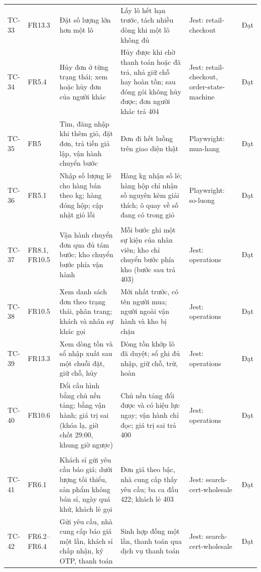 \begin{longtable}{L{1.40cm} L{1.55cm} L{4.00cm} L{4.05cm} L{1.95cm} L{1.95cm}}
TC-33 & FR13.3 & Đặt số lượng lớn hơn một lô & Lấy lô hết hạn trước, tách nhiều dòng khi một lô không đủ & Jest: retail-checkout & Đạt \\
TC-34 & FR5.4 & Hủy đơn ở từng trạng thái; xem hoặc hủy đơn của người khác & Hủy được khi chờ thanh toán hoặc đã trả, nhả giữ chỗ hay hoàn tồn; sau đóng gói không hủy được; đơn người khác trả 404 & Jest: retail-checkout, order-state-machine & Đạt \\
TC-35 & FR5 & Tìm, đăng nhập khi thêm giỏ, đặt đơn, trả tiền giả lập, vận hành chuyển bước & Đơn đi hết luồng trên giao diện thật & Playwright: mua-hang & Đạt \\
TC-36 & FR5.1 & Nhập số lượng lẻ cho hàng bán theo kg; hàng đóng hộp; cập nhật giỏ lỗi & Hàng kg nhận số lẻ; hàng hộp chỉ nhận số nguyên kèm giải thích; ô quay về số đang có trong giỏ & Playwright: so-luong & Đạt \\
 \\
TC-37 & FR8.1, FR10.5 & Vận hành chuyển đơn qua đủ tám bước; kho chuyển bước phía vận hành & Mỗi bước ghi một sự kiện của nhân viên; kho chỉ chuyển bước phía kho (bước sau trả 403) & Jest: operations & Đạt \\
TC-38 & FR10.5 & Xem danh sách đơn theo trạng thái, phân trang; khách và nhân sự khác gọi & Mới nhất trước, có tên người mua; người ngoài vận hành và kho bị chặn & Jest: operations & Đạt \\
TC-39 & FR13.3 & Xem dòng tồn và sổ nhập xuất sau một chuỗi đặt, giữ chỗ, hủy & Dòng tồn khớp lô đã duyệt; sổ ghi đủ nhập, giữ chỗ, trừ, hoàn & Jest: operations & Đạt \\
TC-40 & FR10.6 & Đổi cấu hình bằng chủ nền tảng; bằng vận hành; giá trị sai (khóa lạ, giờ chốt 29:00, khung giờ ngược) & Chủ nền tảng đổi được và có hiệu lực ngay; vận hành chỉ đọc; giá trị sai trả 400 & Jest: operations & Đạt \\
 \\
TC-41 & FR6.1 & Khách sỉ gửi yêu cầu báo giá; dưới lượng tối thiểu, sản phẩm không bán sỉ, ngày quá khứ, khách lẻ gọi & Đơn giá theo bậc, nhà cung cấp thấy yêu cầu; ba ca đầu 422; khách lẻ 403 & Jest: search-cert-wholesale & Đạt \\
TC-42 & FR6.2--FR6.4 & Gửi yêu cầu, nhà cung cấp báo giá một lần, khách sỉ chấp nhận, ký OTP, thanh toán & Sinh hợp đồng một lần, thanh toán qua dịch vụ thanh toán & Jest: search-cert-wholesale & Đạt \\

\end{longtable}
